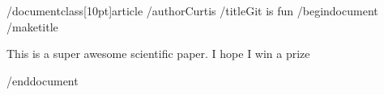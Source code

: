 /documentclass[10pt]{article}
/author{Curtis}
/title{Git is fun}
/begin{document}
	/maketitle

	This is a super awesome scientific paper.
	I hope I win a prize

/end{document}
